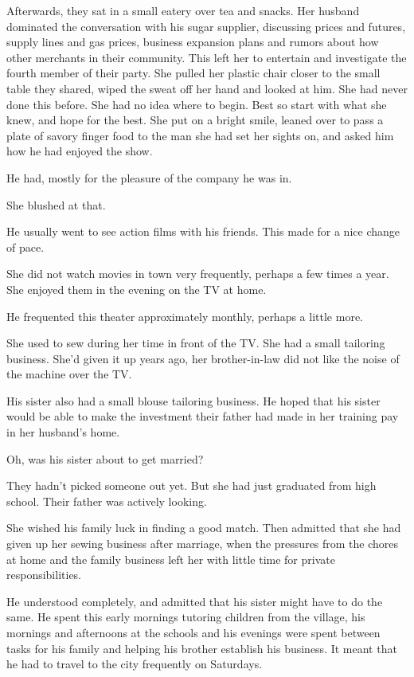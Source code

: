\documentclass{article}
\begin{document}
Afterwards, they sat in a small eatery over tea and snacks. Her husband dominated the conversation with his sugar supplier, discussing prices and futures, supply lines and gas prices, business expansion plans and rumors about how other merchants in their community. This left her to entertain and investigate the fourth member of their party. She pulled her plastic chair closer to the small table they shared, wiped the sweat off her hand and looked at him. She had never done this before. She had no idea where to begin. Best so start with what she knew, and hope for the best. She put on a bright smile, leaned over to pass a plate of savory finger food to the man she had set her sights on, and asked him how he had enjoyed the show.

He had, mostly for the pleasure of the company he was in. 

She blushed at that.

He usually went to see action films with his friends. This made for a nice change of pace.

She did not watch movies in town very frequently, perhaps a few times a year. She enjoyed them in the evening on the TV at home. 

He frequented this theater approximately monthly, perhaps a little more. 

She used to sew during her time in front of the TV. She had a small tailoring business. She'd given it up years ago, her brother-in-law did not like the noise of the machine over the TV.

His sister also had a small blouse tailoring business. He hoped that his sister would be able to make the investment their father had made in her training pay in her husband's home.

Oh, was his sister about to get married?

They hadn't picked someone out yet. But she had just graduated from high school. Their father was actively looking.

She wished his family luck in finding a good match. Then admitted that she had given up her sewing business after marriage, when the pressures from the chores at home and the family business left her with little time for private responsibilities. 

He understood completely, and admitted that his sister might have to do the same.  He spent this early mornings tutoring children from the village, his mornings and afternoons at the schools and his evenings were spent between tasks for his family and helping his brother establish his business. It meant that he had to travel to the city frequently on Saturdays.
\end{document}
